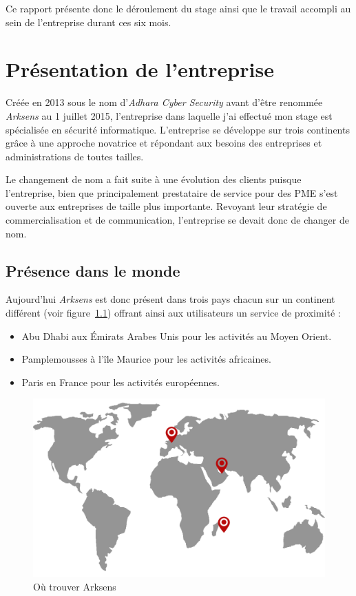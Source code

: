 \documentclass[a4paper,10pt, twoside]{report}
\begin{document}
\begin{spacing}{1.2}
Ce rapport pr\'esente donc le d\'eroulement du stage ainsi que le travail
accompli au sein de l'entreprise durant ces six mois.

\chapter{Pr\'esentation de l'entreprise}
\thispagestyle{fancy}
Cr\'e\'ee en 2013 sous le nom d'\textit{Adhara Cyber Security} avant
d'\^etre renomm\'ee \textit{Arksens} au 1 juillet 2015, l'entreprise 
dans laquelle j'ai effectu\'e mon stage est sp\'ecialis\'ee en s\'ecurit\'e
informatique. L'entreprise se d\'eveloppe sur trois continents gr\^ace \`a une
approche novatrice et r\'epondant aux besoins des entreprises et
administrations de toutes tailles.

Le changement de nom a fait suite \`a une \'evolution des clients puisque
l'entreprise, bien que principalement prestataire de service pour des PME
s'est ouverte aux entreprises de taille plus importante. Revoyant leur
strat\'egie de commercialisation et de communication, l'entreprise se devait
donc de changer de nom.

\section{Pr\'esence dans le monde}
Aujourd'hui \textit{Arksens} est donc pr\'esent dans trois pays chacun sur
un continent diff\'erent (voir figure~\ref{mapArksens}) offrant ainsi aux
utilisateurs un service de proximit\'e :
\begin{itemize}
  \item Abu Dhabi aux \'Emirats Arabes Unis pour les activit\'es au Moyen
  Orient.
  \item Pamplemousses à l’\^ile Maurice pour les activit\'es africaines.
  \item Paris en France pour les activit\'es européennes.
\end{itemize}

\begin{figure}[h!]
  \centering
  \includegraphics[scale=0.30]{map_arksens.png}
  \caption{\label{mapArksens} O\`u trouver Arksens}
\end{figure}
      

\end{spacing}
\end{document}
